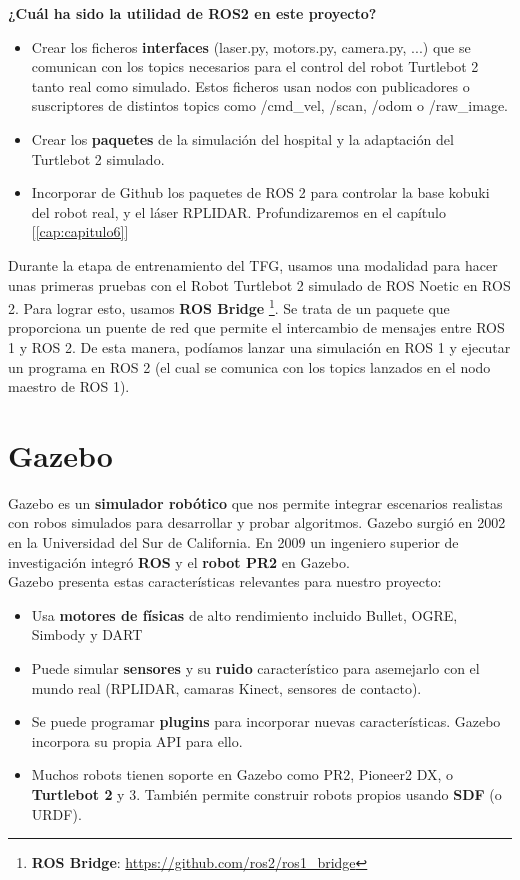 \textbf{¿Cuál ha sido la utilidad de ROS2 en este proyecto?}
\begin{itemize}
	\item Crear los ficheros \textbf{interfaces} (laser.py, motors.py, camera.py, ...) que se comunican con los topics necesarios para el control del robot Turtlebot 2 tanto real como simulado. Estos ficheros usan nodos con publicadores o suscriptores de distintos topics como /cmd\_vel, /scan, /odom o /raw\_image.
	\item Crear los \textbf{paquetes} de la simulación del hospital y la adaptación del Turtlebot 2 simulado.
	\item Incorporar de Github los paquetes de ROS 2 para controlar la base kobuki del robot real, y el láser RPLIDAR. Profundizaremos en el capítulo [\ref{cap:capitulo6}]
\end{itemize}

Durante la etapa de entrenamiento del TFG, usamos una modalidad para hacer unas primeras pruebas con el Robot Turtlebot 2 simulado de ROS Noetic en ROS 2. Para lograr esto, usamos \textbf{ROS Bridge} \footnote{\textbf{ROS Bridge}: \url{https://github.com/ros2/ros1_bridge}}. Se trata de un paquete que proporciona un puente de red que permite el intercambio de mensajes entre ROS 1 y ROS 2. De esta manera, podíamos lanzar una simulación en ROS 1 y ejecutar un programa en ROS 2 (el cual se comunica con los topics lanzados en el nodo maestro de ROS 1).\\




\section{Gazebo}
\label{sec:gazebo}

Gazebo \cite{Gazebo} es un \textbf{simulador robótico} que nos permite integrar escenarios realistas con robos simulados para desarrollar y probar algoritmos. Gazebo surgió en 2002 en la Universidad del Sur de California. En 2009 un ingeniero superior de investigación integró \textbf{ROS} y el \textbf{robot PR2} en Gazebo.\\

Gazebo presenta estas características relevantes para nuestro proyecto:
\begin{itemize}
	\item Usa \textbf{motores de físicas} de alto rendimiento incluido Bullet, OGRE, Simbody y DART
	\item Puede simular \textbf{sensores} y su \textbf{ruido} característico para asemejarlo con el mundo real (RPLIDAR, camaras Kinect, sensores de contacto).
	\item Se puede programar \textbf{plugins} para incorporar nuevas características. Gazebo incorpora su propia API para ello.
	\item Muchos robots tienen soporte en Gazebo como PR2, Pioneer2 DX,  o \textbf{Turtlebot 2} y 3. También permite construir robots propios usando \textbf{SDF} (o URDF).
\end{itemize}

